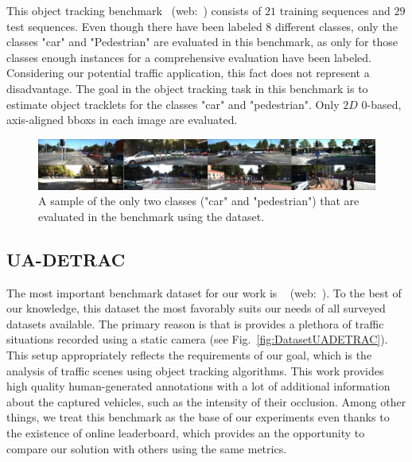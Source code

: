 This object tracking benchmark~\cite{geiger2012cvpr} (web:~\cite{webkittiobjtrackingdataset}) consists of $21$ training sequences and $29$ test sequences. Even though there have been labeled $8$ different classes, only the classes "car" and "Pedestrian" are evaluated in this benchmark, as only for those classes enough instances for a comprehensive evaluation have been labeled. Considering our potential traffic application, this fact does not represent a disadvantage. The goal in the object tracking task in this benchmark is to estimate object tracklets for the classes "car" and "pedestrian". Only $2D$ $0$-based, axis-aligned \glspl{bbox} in each image are evaluated.

\begin{figure}[t]
    \centerline{\includegraphics[width=\linewidth]{figures/datasets/kitti_object_tracking_sample.jpg}}
    \caption[ dataset]{A sample of the only two classes ("car" and "pedestrian") that are evaluated in the benchmark using the  dataset. }
    \label{fig:DatasetKITTIObjectTracking}
\end{figure}

\subsection{UA-DETRAC}
\label{ssec:DatasetUADETRAC}

The most important benchmark dataset for our work is \uadetrac{}~\cite{wen2020uadetrac} (web:~\cite{webuadetracdataset}). To the best of our knowledge, this dataset the most favorably suits our needs of all surveyed datasets available. The primary reason is that is provides a plethora of traffic situations recorded using a static camera (see Fig.~\ref{fig:DatasetUADETRAC}). This setup appropriately reflects the requirements of our goal, which is the analysis of traffic scenes using object tracking algorithms. This work provides high quality human-generated annotations with a lot of additional information about the captured vehicles, such as the intensity of their occlusion. Among other things, we treat this benchmark as the base of our experiments even thanks to the existence of online leaderboard, which provides an the opportunity to compare our solution with others using the same metrics.

